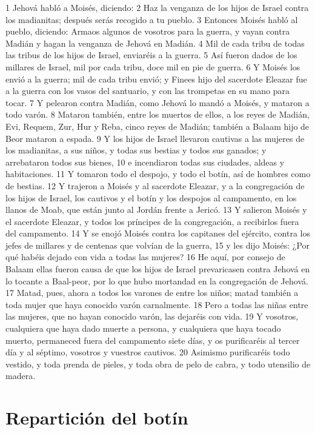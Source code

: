 1 Jehová habló a Moisés, diciendo:
2 Haz la venganza de los hijos de Israel contra los madianitas; después serás recogido a tu pueblo.
3 Entonces Moisés habló al pueblo, diciendo: Armaos algunos de vosotros para la guerra, y vayan contra Madián y hagan la venganza de Jehová en Madián.
4 Mil de cada tribu de todas las tribus de los hijos de Israel, enviaréis a la guerra.
5 Así fueron dados de los millares de Israel, mil por cada tribu, doce mil en pie de guerra.
6 Y Moisés los envió a la guerra; mil de cada tribu envió; y Finees hijo del sacerdote Eleazar fue a la guerra con los vasos del santuario, y con las trompetas en su mano para tocar.
7 Y pelearon contra Madián, como Jehová lo mandó a Moisés, y mataron a todo varón.
8 Mataron también, entre los muertos de ellos, a los reyes de Madián, Evi, Requem, Zur, Hur y Reba, cinco reyes de Madián; también a Balaam hijo de Beor mataron a espada.
9 Y los hijos de Israel llevaron cautivas a las mujeres de los madianitas, a sus niños, y todas sus bestias y todos sus ganados; y arrebataron todos sus bienes,
10 e incendiaron todas sus ciudades, aldeas y habitaciones.
11 Y tomaron todo el despojo, y todo el botín, así de hombres como de bestias.
12 Y trajeron a Moisés y al sacerdote Eleazar, y a la congregación de los hijos de Israel, los cautivos y el botín y los despojos al campamento, en los llanos de Moab, que están junto al Jordán frente a Jericó.
13 Y salieron Moisés y el sacerdote Eleazar, y todos los príncipes de la congregación, a recibirlos fuera del campamento.
14 Y se enojó Moisés contra los capitanes del ejército, contra los jefes de millares y de centenas que volvían de la guerra,
15 y les dijo Moisés: ¿Por qué habéis dejado con vida a todas las mujeres?
16 He aquí, por consejo de Balaam ellas fueron causa de que los hijos de Israel prevaricasen contra Jehová en lo tocante a Baal-peor, por lo que hubo mortandad en la congregación de Jehová.
17 Matad, pues, ahora a todos los varones de entre los niños; matad también a toda mujer que haya conocido varón carnalmente.
18 Pero a todas las niñas entre las mujeres, que no hayan conocido varón, las dejaréis con vida.
19 Y vosotros, cualquiera que haya dado muerte a persona, y cualquiera que haya tocado muerto, permaneced fuera del campamento siete días, y os purificaréis al tercer día y al séptimo, vosotros y vuestros cautivos.
20 Asimismo purificaréis todo vestido, y toda prenda de pieles, y toda obra de pelo de cabra, y todo utensilio de madera.

\section*{Repartición del botín}

